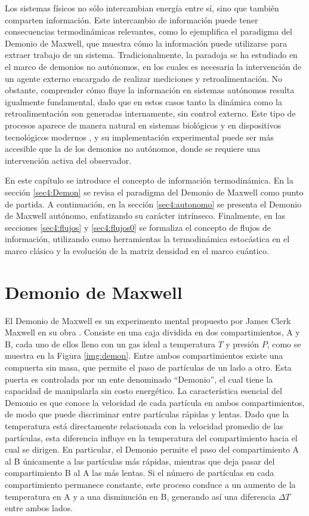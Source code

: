 Los sistemas físicos no sólo intercambian energía entre sí, sino que también comparten información. Este intercambio de información puede tener consecuencias termodinámicas relevantes, como lo ejemplifica el paradigma del Demonio de Maxwell, que muestra cómo la información puede utilizarse para extraer trabajo de un sistema. Tradicionalmente, la paradoja se ha estudiado en el marco de demonios no autónomos, en los cuales es necesaria la intervención de un agente externo encargado de realizar mediciones y retroalimentación. No obstante, comprender cómo fluye la información en sistemas autónomos resulta igualmente fundamental, dado que en estos casos tanto la dinámica como la retroalimentación son generadas internamente, sin control externo. Este tipo de procesos aparece de manera natural en sistemas biológicos y en dispositivos tecnológicos modernos \cite{parrondo2023information,koski2015chip}, y su implementación experimental puede ser más accesible que la de los demonios no autónomos, donde se requiere una intervención activa del observador.

En este capítulo se introduce el concepto de información termodinámica. En la sección \ref{sec4:Demon} se revisa el paradigma del Demonio de Maxwell como punto de partida. A continuación, en la sección \ref{sec4:autonomo} se presenta el Demonio de Maxwell autónomo, enfatizando su carácter intrínseco. Finalmente, en las secciones \ref{sec4:flujos} y \ref{sec4:flujos0} se formaliza el concepto de flujos de información, utilizando como herramientas la termodinámica estocástica en el marco clásico y la evolución de la matriz densidad en el marco cuántico\cite{horowitz2014thermodynamics,ptaszynski2019thermodynamics}.

\section{Demonio de Maxwell}

El Demonio de Maxwell es un experimento mental propuesto por James Clerk Maxwell en su obra \cite{Maxwell_1871}. Consiste en una caja dividida en dos compartimientos, A y B, cada uno de ellos lleno con un gas ideal a temperatura $T$ y presión $P$, como se muestra en la Figura \ref{img:demon}. Entre ambos compartimientos existe una compuerta sin masa, que permite el paso de partículas de un lado a otro. Esta puerta es controlada por un ente denominado ``Demonio'', el cual tiene la capacidad de manipularla sin costo energético. La característica esencial del Demonio es que conoce la velocidad de cada partícula en ambos compartimientos, de modo que puede discriminar entre partículas rápidas y lentas. Dado que la temperatura está directamente relacionada con la velocidad promedio de las partículas, esta diferencia influye en la temperatura del compartimiento hacia el cual se dirigen. En particular, el Demonio permite el paso del compartimiento A al B únicamente a las partículas más rápidas, mientras que deja pasar del compartimiento B al A las más lentas. Si el número de partículas en cada compartimiento permanece constante, este proceso conduce a un aumento de la temperatura en A y a una disminución en B, generando así una diferencia $\Delta T$ entre ambos lados.

